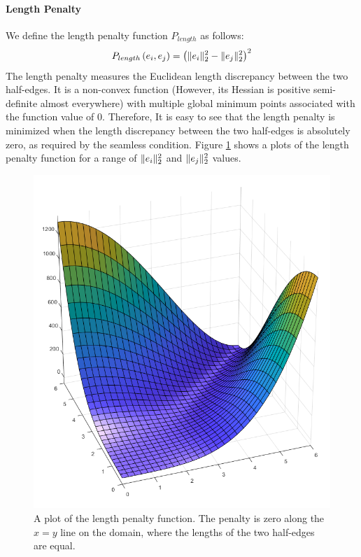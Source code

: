 \paragraph{Length Penalty}
We define the length penalty function $P_{length}$ as follows:
\begin{equation}\label{length_penalty}
\begin{split}
P_{length}\left(e_i,e_j\right) = \left(\lVert e_i\rVert_2^2 - \lVert e_j\rVert_2^2\right)^2
\end{split}
\end{equation}
The length penalty measures the Euclidean length discrepancy between the two half-edges. It is a non-convex function (However, its Hessian is positive semi-definite almost everywhere) with multiple global minimum points associated with the function value of $0$. Therefore, It is easy to see that the length penalty is minimized when the length discrepancy between the two half-edges is absolutely zero, as required by the seamless condition. Figure \ref{fig:length_penalty} shows a plots of the length penalty function for a range of $\lVert e_i\rVert_2^2$ and $\lVert e_j\rVert_2^2$ values.
\begin{figure}[ht]
\centering
\includegraphics[width=12cm]{figures/seamless/length_penalty_function.png}
\caption[The Length Penalty Function]{A plot of the length penalty function. The penalty is zero along the $x=y$ line on the domain, where the lengths of the two half-edges are equal.}
\label{fig:length_penalty}
\end{figure}
